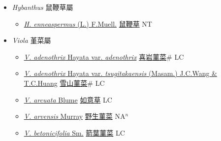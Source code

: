 
  \begin{itemize}
 \item[] \textit{Hybanthus} 鼠鞭草屬
                    
  \begin{itemize}
        \item[] \href{http://www.theplantlist.org/tpl1.1/search?q=Hybanthus+enneaspermus}{\textit{H. enneaspermus} (L.) F.Muell.}   \href{\detokenize{http://taibnet.sinica.edu.tw/chi/taibnet_species_list.php?T2=鼠鞭草&T2_new_value=true&fr=y}}{鼠鞭草} NT
  \end{itemize}
 \item[] \textit{Viola} 堇菜屬
                    
  \begin{itemize}
        \item[] \href{http://www.theplantlist.org/tpl1.1/search?q=Viola+adenothrix+var.+adenothrix}{\textit{V. adenothrix} Hayata var. \textit{adenothrix}}   \href{\detokenize{http://taibnet.sinica.edu.tw/chi/taibnet_species_list.php?T2=喜岩菫菜&T2_new_value=true&fr=y}}{喜岩菫菜}\# LC
        \item[] \href{http://www.theplantlist.org/tpl1.1/search?q=Viola+adenothrix+var.+tsugitakaensis}{\textit{V. adenothrix} Hayata var. \textit{tsugitakaensis} (Masam.) J.C.Wang \& T.C.Huang}   \href{\detokenize{http://taibnet.sinica.edu.tw/chi/taibnet_species_list.php?T2=雪山菫菜&T2_new_value=true&fr=y}}{雪山菫菜}\# LC
        \item[] \href{http://www.theplantlist.org/tpl1.1/search?q=Viola+arcuata}{\textit{V. arcuata} Blume}   \href{\detokenize{http://taibnet.sinica.edu.tw/chi/taibnet_species_list.php?T2=如意草&T2_new_value=true&fr=y}}{如意草} LC
        \item[] \href{http://www.theplantlist.org/tpl1.1/search?q=Viola+arvensis}{\textit{V. arvensis} Murray}   \href{\detokenize{http://taibnet.sinica.edu.tw/chi/taibnet_species_list.php?T2=野生菫菜&T2_new_value=true&fr=y}}{野生菫菜} NA$^n$
        \item[] \href{http://www.theplantlist.org/tpl1.1/search?q=Viola+betonicifolia}{\textit{V. betonicifolia} Sm.}   \href{\detokenize{http://taibnet.sinica.edu.tw/chi/taibnet_species_list.php?T2=箭葉菫菜&T2_new_value=true&fr=y}}{箭葉菫菜} LC

\end{itemize}
\end{itemize}
